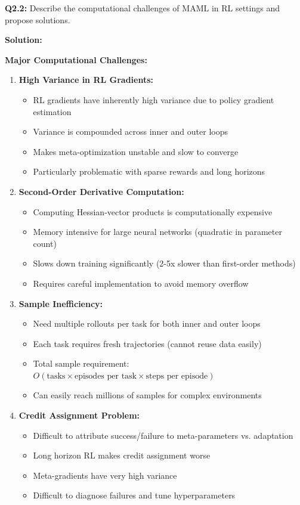 \documentclass[12pt]{article}
\newcommand{\ieee}[1]{\textcolor{IEEEBlue}{\textbf{#1}}}
\begin{document}
{{			\textbf{Q2.2:} Describe the computational challenges of MAML in RL settings and propose solutions.
			
			\textbf{Solution:}
			
			\ieee{Major Computational Challenges:}
			
			\begin{enumerate}
				\item \textbf{High Variance in RL Gradients:}
				\begin{itemize}
					\item RL gradients have inherently high variance due to policy gradient estimation
					\item Variance is compounded across inner and outer loops
					\item Makes meta-optimization unstable and slow to converge
					\item Particularly problematic with sparse rewards and long horizons
				\end{itemize}
				
				\item \textbf{Second-Order Derivative Computation:}
				\begin{itemize}
					\item Computing Hessian-vector products is computationally expensive
					\item Memory intensive for large neural networks (quadratic in parameter count)
					\item Slows down training significantly (2-5x slower than first-order methods)
					\item Requires careful implementation to avoid memory overflow
				\end{itemize}
				
				\item \textbf{Sample Inefficiency:}
				\begin{itemize}
					\item Need multiple rollouts per task for both inner and outer loops
					\item Each task requires fresh trajectories (cannot reuse data easily)
					\item Total sample requirement: $O(\text{tasks} \times \text{episodes per task} \times \text{steps per episode})$
					\item Can easily reach millions of samples for complex environments
				\end{itemize}
				
				\item \textbf{Credit Assignment Problem:}
				\begin{itemize}
					\item Difficult to attribute success/failure to meta-parameters vs. adaptation
					\item Long horizon RL makes credit assignment worse
					\item Meta-gradients have very high variance
					\item Difficult to diagnose failures and tune hyperparameters
				\end{itemize}
			\end{enumerate}
			
}}
\end{document}
